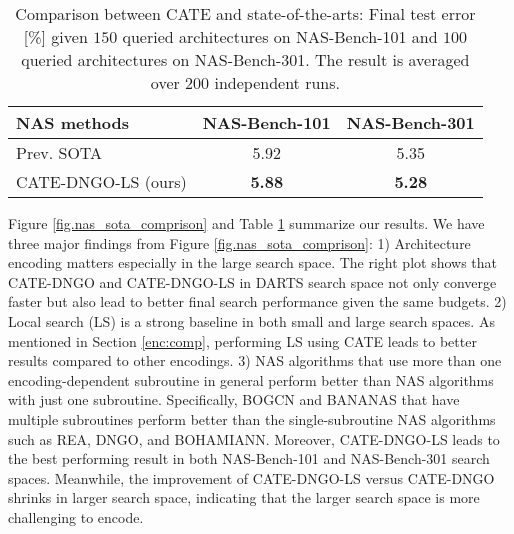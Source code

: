 \begin{table}[t]

\centering
\begin{adjustbox}{width=1.0\columnwidth}
{\small
\begin{tabular}{@{}l|c|c@{}}
\toprule
\multicolumn{1}{l}{\textbf{NAS methods}} & \multicolumn{1}{c}{\textbf{NAS-Bench-101}} & \multicolumn{1}{c}{\textbf{NAS-Bench-301}}\\
\midrule 
Prev. SOTA \cite{white2019bananas} & 5.92 & 5.35  \\ 
CATE-DNGO-LS (ours) & \textbf{5.88} & \textbf{5.28} \\
\bottomrule
\end{tabular}
}
\end{adjustbox}
\caption{Comparison between CATE and state-of-the-arts: Final test error [\%] given $150$ queried architectures on NAS-Bench-101 and $100$ queried architectures on NAS-Bench-301. The result is averaged over $200$ independent runs.}
\label{table:nasbench101-nasbench301-query-comparison}
\end{table}


Figure \ref{fig.nas_sota_comprison} and Table \ref{table:nasbench101-nasbench301-query-comparison} summarize our results. We have three major findings from Figure \ref{fig.nas_sota_comprison}:
1) Architecture encoding matters especially in the large search space. The right plot shows that CATE-DNGO and CATE-DNGO-LS in DARTS search space not only converge faster but also lead to better final search performance given the same budgets.
2) Local search (LS) is a strong baseline in both small and large search spaces. As mentioned in Section \ref{enc:comp}, performing LS using CATE leads to better results compared to other encodings.
3) NAS algorithms that use more than one encoding-dependent subroutine in general perform better than NAS algorithms with just one subroutine. Specifically, BOGCN and BANANAS that have multiple subroutines perform better than the single-subroutine NAS algorithms such as REA, DNGO, and BOHAMIANN.
Moreover, CATE-DNGO-LS leads to the best performing result in both NAS-Bench-101 and NAS-Bench-301 search spaces.
Meanwhile, the improvement of CATE-DNGO-LS versus CATE-DNGO shrinks in larger search space, indicating that the larger search space is more challenging to encode.


